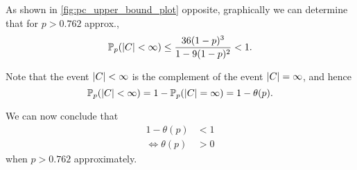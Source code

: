 \documentclass[a4paper, 12pt]{article}
\begin{document}


As shown in \cref{fig:pc_upper_bound_plot} opposite, graphically we can determine that for $p > 0.762$ approx., \[\mathbb{P}_p(\lvert C \rvert < \infty) \leq \frac{36(1 - p)^3}{1 - 9(1 - p)^2} < 1.\]

Note that the event $\lvert C \rvert < \infty$ is the complement of the event $\lvert C \rvert = \infty$, and hence
\[
    \mathbb{P}_p(\lvert C \rvert < \infty) = 1 - \mathbb{P}_p(\lvert C \rvert = \infty) = 1 - \theta(p).
\]

We can now conclude that
\begin{align*}
    1 - \theta(p) &< 1\\
    \iff \theta(p) &> 0
\end{align*}
when $p > 0.762$ approximately.

\end{document}

